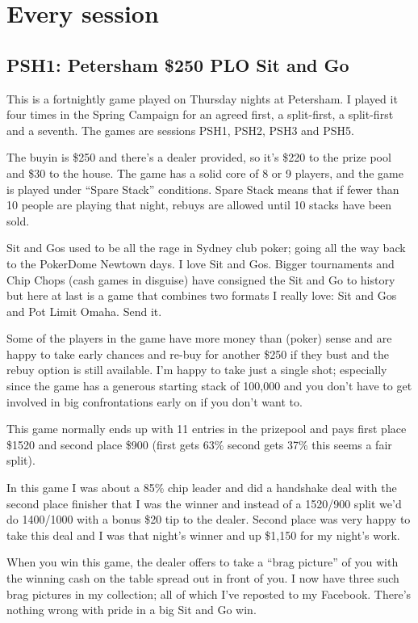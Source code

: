 \chapter{Every session}

\section*{PSH1: Petersham \$250 PLO Sit and Go}

This is a fortnightly game played on Thursday nights at Petersham.
I played it four times in the Spring Campaign for an agreed first,
a split-first, a split-first and a seventh. The games are sessions
PSH1, PSH2, PSH3 and PSH5.

The buyin is \$250 and there's a dealer provided, so it's \$220 to
the prize pool and \$30 to the house. The game has a solid core of
8 or 9 players, and the game is played under ``Spare Stack''
conditions. Spare Stack means that if fewer than 10 people are playing
that night, rebuys are allowed until 10 stacks have been sold.

Sit and Gos used to be all the rage in Sydney club poker; going all
the way back to the PokerDome Newtown days. I love Sit and Gos.
Bigger tournaments and Chip Chops (cash games in disguise) have
consigned the Sit and Go to history but here at last is a game that
combines two formats I really love: Sit and Gos and Pot Limit
Omaha. Send it.

Some of the players in the game have more money than (poker) sense and
are happy to take early chances and re-buy for another \$250 if they
bust and the rebuy option is still available. I'm happy to take just a
single shot; especially since the game has a generous starting stack
of 100,000 and you don't have to get involved in big confrontations
early on if you don't want to.

This game normally ends up with 11 entries in the prizepool and pays
first place \$1520 and second place \$900 (first gets 63\% second gets
37\% this seems a fair split).

In this game I was about a 85\% chip leader and did a handshake deal
with the second place finisher that I was the winner and instead of a
1520/900 split we'd do 1400/1000 with a bonus \$20 tip to the
dealer. Second place was very happy to take this deal and I was that
night's winner and up \$1,150 for my night's work.

When you win this game, the dealer offers to take a ``brag picture''
of you with the winning cash on the table spread out in front of
you. I now have three such brag pictures in my collection; all of which
I've reposted to my Facebook. There's nothing wrong with
pride in a big Sit and Go win.

